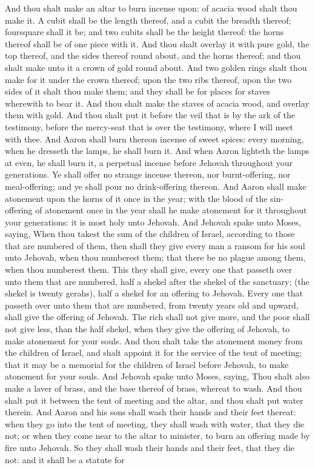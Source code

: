 And thou shalt make an altar to burn incense upon: of acacia wood shalt thou make it. A cubit shall be the length thereof, and a cubit the breadth thereof; foursquare shall it be; and two cubits shall be the height thereof: the horns thereof shall be of one piece with it. And thou shalt overlay it with pure gold, the top thereof, and the sides thereof round about, and the horns thereof; and thou shalt make unto it a crown of gold round about. And two golden rings shalt thou make for it under the crown thereof; upon the two ribs thereof, upon the two sides of it shalt thou make them; and they shall be for places for staves wherewith to bear it. And thou shalt make the staves of acacia wood, and overlay them with gold. And thou shalt put it before the veil that is by the ark of the testimony, before the mercy-seat that is over the testimony, where I will meet with thee. And Aaron shall burn thereon incense of sweet spices: every morning, when he dresseth the lamps, he shall burn it. And when Aaron lighteth the lamps at even, he shall burn it, a perpetual incense before Jehovah throughout your generations. Ye shall offer no strange incense thereon, nor burnt-offering, nor meal-offering; and ye shall pour no drink-offering thereon. And Aaron shall make atonement upon the horns of it once in the year; with the blood of the sin-offering of atonement once in the year shall he make atonement for it throughout your generations: it is most holy unto Jehovah.  And Jehovah spake unto Moses, saying, When thou takest the sum of the children of Israel, according to those that are numbered of them, then shall they give every man a ransom for his soul unto Jehovah, when thou numberest them; that there be no plague among them, when thou numberest them. This they shall give, every one that passeth over unto them that are numbered, half a shekel after the shekel of the sanctuary; (the shekel is twenty gerahs), half a shekel for an offering to Jehovah. Every one that passeth over unto them that are numbered, from twenty years old and upward, shall give the offering of Jehovah. The rich shall not give more, and the poor shall not give less, than the half shekel, when they give the offering of Jehovah, to make atonement for your souls. And thou shalt take the atonement money from the children of Israel, and shalt appoint it for the service of the tent of meeting; that it may be a memorial for the children of Israel before Jehovah, to make atonement for your souls.  And Jehovah spake unto Moses, saying, Thou shalt also make a laver of brass, and the base thereof of brass, whereat to wash. And thou shalt put it between the tent of meeting and the altar, and thou shalt put water therein. And Aaron and his sons shall wash their hands and their feet thereat: when they go into the tent of meeting, they shall wash with water, that they die not; or when they come near to the altar to minister, to burn an offering made by fire unto Jehovah. So they shall wash their hands and their feet, that they die not: and it shall be a statute for 
